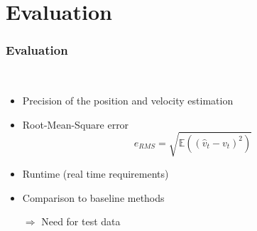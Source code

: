 \section{Evaluation}
\begin{frame}
  \frametitle{Evaluation}
  \begin{description}[]
  \item[What to evaluate] \hfill \\
  \begin{itemize}
  \item Precision of the position and velocity estimation
  \item Root-Mean-Square error
        $$e_{RMS}=\sqrt{\mathbb{E}((\hat{v}_t-v_t)^2)}$$
  \item Runtime (real time requirements)
  \item Comparison to baseline methods
  \item[$\Rightarrow$] Need for test data
  \end{itemize}
  \end{description}
\end{frame}

